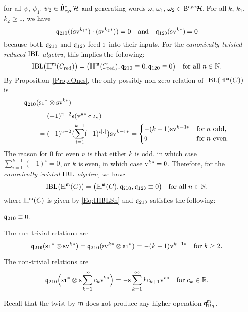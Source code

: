 \documentclass[\MainFolder/Text.tex]{subfiles}
\begin{document}
for all $\psi$, $\psi_1$, $\psi_2 \in \hat{\mathrm{B}}_{\mathrm{cyc}}^*\mathcal{H}$ and generating words $\omega$, $\omega_1$, $\omega_2\in \mathrm{B}^{\mathrm{cyc}}\mathcal{H}$. For all $k$, $k_1$, $k_2 \ge 1$, we have
$$ \mathfrak{q}_{210}((\mathrm{s} \mathrm{v}^{k_1*}) \cdot (\mathrm{s} \mathrm{v}^{k_2*})) = 0\quad\text{and}\quad \mathfrak{q}_{120}(\mathrm{s} \mathrm{v}^{k*}) = 0$$
because both $\mathfrak{q}_{210}$ and $\mathfrak{q}_{120}$ feed $\NOne$ into their inputs. For the \emph{canonically twisted reduced $\mathrm{IBL}$-algebra}, this implies the following:
$$ \mathrm{IBL}\bigl(\mathbb{H}^{\mathfrak{m}}(C_{\mathrm{red}})\bigr) = \bigl(\mathbb{H}^{\mathfrak{m}}(C_{\mathrm{red}}), \mathfrak{q}_{210} \equiv 0, \mathfrak{q}_{120} \equiv 0 \bigr)\quad \text{for all }n\in \mathbb{N}.  $$
By Proposition~\ref{Prop:Ones}, the only possibly non-zero relation  of $\mathrm{IBL}(\mathbb{H}^{\mathfrak{m}}(C))$ is   
$$\begin{aligned}
& \OPQ_{210}(\Susp \NOne^* \otimes \Susp \NVol^{k*}) \\[\jot]
&\qquad = (-1)^{n-2} \Susp (\NVol^{k*} \circ \iota_\NVol) \\ 
&\qquad = (-1)^{n-2}\bigl(\sum_{i=1}^{k-1} (-1)^{i \Abs{\NVol}}\bigr)\Susp\NVol^{k-1 *}
= \begin{cases}
   -(k-1) \Susp \NVol^{k-1*} & \text{for }n\text{ odd},\\
    0 & \text{for }n\text{ even}.
  \end{cases}\end{aligned}$$
The reason for $0$ for even $n$ is that either $k$ is odd, in which case $\sum_{i=1}^{k-1} (-1)^i = 0$, or $k$ is even, in which case $\mathrm{v}^{k*} = 0$. Therefore, for the \emph{canonically twisted $\mathrm{IBL}$-algebra}, we have
\begin{equation*}
\mathrm{IBL}\bigl(\mathbb{H}^{\mathfrak{m}}(C)\bigr) = \bigl(\mathbb{H}^{\mathfrak{m}}(C), \mathfrak{q}_{210}, \mathfrak{q}_{120} \equiv 0 \bigr)\quad \text{for all }n\in \mathbb{N},
\end{equation*}
where $\mathbb{H}^{\mathfrak{m}}(C)$ is given by \eqref{Eq:HIBLSn} and $\mathfrak{q}_{210}$ satisfies the following:
\begin{description}[font=\normalfont\itshape]
\item[($n$ even):] $\mathfrak{q}_{210} \equiv 0$.
\item[($n\ge 3$ odd):] The non-trivial relations are
$$ \OPQ_{210}(\Susp \NOne^* \otimes \Susp \NVol^{k*}) = \OPQ_{210}(\Susp \NVol^{k*} \otimes \Susp \NOne^*) = -(k-1) \NVol^{k-1*}\quad\text{for }k\ge 2.  $$
\item[($n=1$):]  The non-trivial relations are
$$ \OPQ_{210}\Bigl(\Susp \NOne^* \otimes \Susp\sum_{k=1}^\infty c_k \NVol^{k*}\Bigr) = - \Susp \sum_{k=1}^\infty k c_{k+1} \NVol^{k*} \quad\text{for }c_k\in \R. $$
\end{description}
Recall that the twist by $\mathfrak{m}$ does not produce any higher operation $\mathfrak{q}_{1lg}^{\mathfrak{m}}$.
\end{document}
